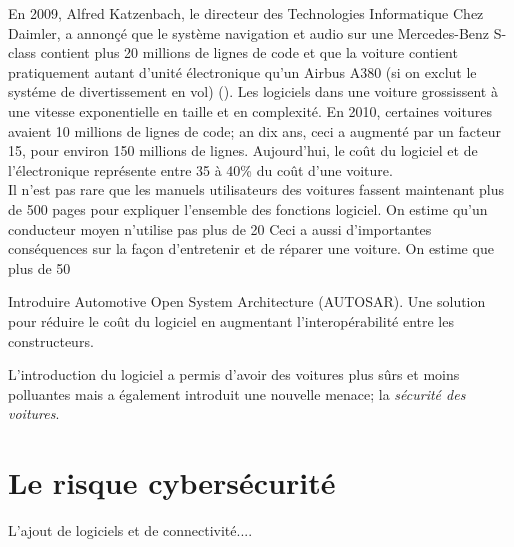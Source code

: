 En 2009, Alfred Katzenbach, le directeur des Technologies Informatique Chez Daimler, a annon\c c\'e
que le syst\`eme navigation et audio sur une Mercedes-Benz  S-class contient plus 20
millions de lignes de code et que la voiture contient pratiquement autant d'unit\'e \'electronique qu'un Airbus A380 (si on exclut le syst\'eme de divertissement en vol) (\cite{Cha2009}).  Les logiciels dans une voiture grossissent \`a une vitesse exponentielle en taille et en complexit\'e. En 2010, certaines voitures avaient 10 millions de lignes de code; an dix ans, ceci a augment\'e par un facteur 15, pour environ 150 millions de lignes.
Aujourd'hui, le co\^ut du logiciel et de l'\'electronique repr\'esente entre 35 \`a 40\% du co\^ut d'une voiture. \\
Il n'est pas rare que les manuels utilisateurs des voitures fassent maintenant plus de 500 pages pour expliquer l'ensemble des fonctions logiciel. On estime qu'un conducteur moyen n'utilise pas plus de 20%
Ceci a aussi d'importantes cons\'equences sur la fa\c con d'entretenir et de r\'eparer une voiture. On estime que plus de 50%


\begin{tbd}
Introduire Automotive Open System Architecture (AUTOSAR). Une solution pour r\'eduire le co\^ut du logiciel en augmentant l'interop\'erabilit\'e entre les constructeurs.
\end{tbd}


L'introduction du logiciel a permis d'avoir des voitures plus s\^urs et moins polluantes mais a \'egalement introduit une nouvelle menace; la \emph{s\'ecurit\'e des voitures}. 


\section {Le risque cybers\'ecurit\'e}
 \medskip
 {\Huge L}'ajout de logiciels et de connectivit\'e....


